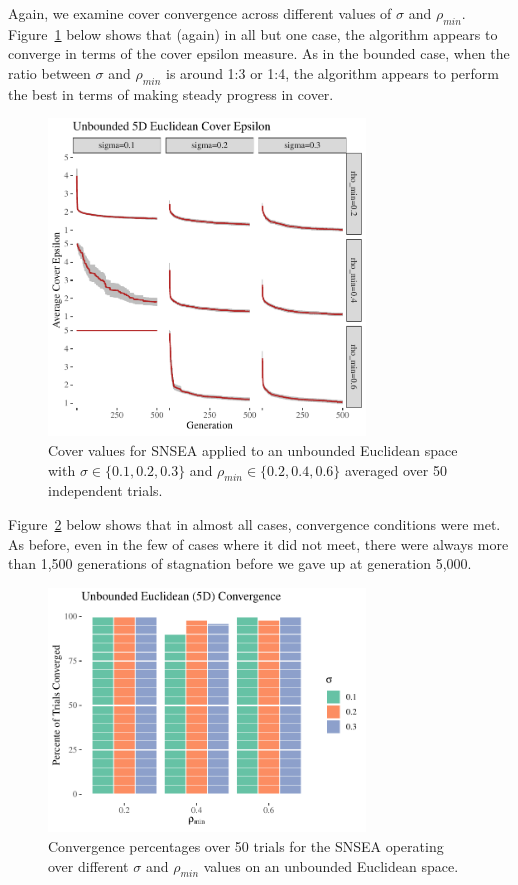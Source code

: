 \documentclass[twoside]{article}
\begin{document}
Again, we examine cover convergence across different values of $\sigma$ and $\rho_{min}$.  Figure~\ref{fig:unbounded:nopop:sm} below shows that (again) in all but one case, the algorithm appears to converge in terms of the cover epsilon measure.  As in the bounded case, when the ratio between $\sigma$ and $\rho_{min}$ is around 1:3 or 1:4, the algorithm appears to perform the best in terms of making steady progress in cover.  
%
\begin{figure}[ht]
  \center\includegraphics[width=0.75\textwidth]{Figures/unbounded-500sm-NOPOP.pdf}
  \caption{\label{fig:unbounded:nopop:sm} Cover values for SNSEA applied to an unbounded Euclidean space with $\sigma\in\{0.1, 0.2, 0.3\}$ and $\rho_{min} \in \{0.2, 0.4, 0.6\}$ averaged over 50 independent trials.}
\end{figure}
%
Figure~\ref{fig:bounded:nopop:conv} below shows that in almost all cases, convergence conditions were met.  As before, even in the few of cases where it did not meet, there were always more than 1,500 generations of stagnation before we gave up at generation 5,000.  
%
\begin{figure}[ht]
  \center\includegraphics[width=0.75\textwidth]{Figures/unbounded-conv-NOPOP.pdf}
  \caption{\label{fig:bounded:nopop:conv} Convergence percentages over 50 trials for the SNSEA operating over different $\sigma$ and $\rho_{min}$ values on an unbounded Euclidean space.}
\end{figure}
%
\end{document}
